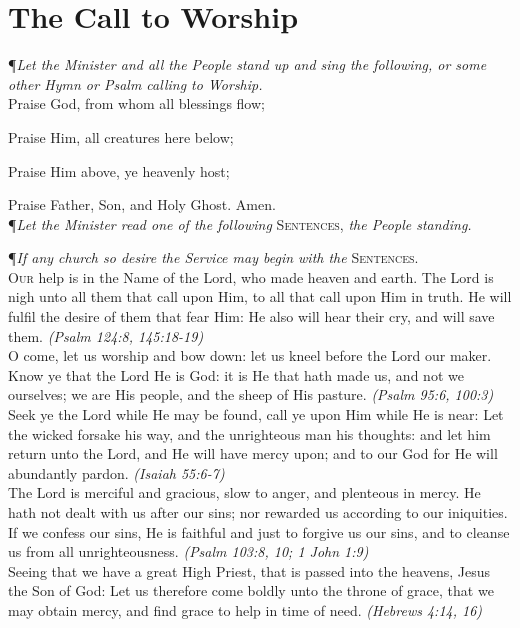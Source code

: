 \section*{The Call to Worship}
\P \textit{Let the Minister and all the People stand up and sing the following, or some other Hymn or Psalm calling to Worship.} \\

Praise God, from whom all blessings flow; \par
Praise Him, all creatures here below; \par
Praise Him above, ye heavenly host; \par
Praise Father, Son, and Holy Ghost. Amen. \\

\noindent\P \textit{Let the Minister read one of the following} \textsc{Sentences,} \textit{the People standing.}

\noindent\P \textit{If any church so desire the Service may begin with the} \textsc{Sentences.} \\

\lettrine{O}{ur} help is in the Name of the Lord, who made heaven and earth.
The Lord is nigh unto all them that call upon Him, to all that call upon Him in truth.
He will fulfil the desire of them that fear Him: He also will hear their cry, and will save them. \textit{(Psalm 124:8, 145:18-19)} \\

O come, let us worship and bow down: let us kneel before the Lord our maker.
Know ye that the Lord He is God: it is He that hath made us, and not we ourselves; we are His people, and the sheep of His pasture. \textit{(Psalm 95:6, 100:3)} \\

Seek ye the Lord while He may be found, call ye upon Him while He is near: Let the wicked forsake his way, and the unrighteous man his thoughts: and let him return unto the Lord, and He will have mercy upon; and to our God for He will abundantly pardon. \textit{(Isaiah 55:6-7)} \\

The Lord is merciful and gracious, slow to anger, and plenteous in mercy.
He hath not dealt with us after our sins; nor rewarded us according to our iniquities.
If we confess our sins, He is faithful and just to forgive us our sins, and to cleanse us from all unrighteousness. \textit{(Psalm 103:8, 10; 1 John 1:9)} \\

Seeing that we have a great High Priest, that is passed into the heavens, Jesus the Son of God: Let us therefore come boldly unto the throne of grace, that we may obtain mercy, and find grace to help in time of need. \textit{(Hebrews 4:14, 16)}

